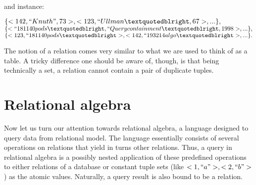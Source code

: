 \documentclass[12pt]{article}
\begin{document}
	and instance:

\begin{adjustwidth}{2cm}{}
		$\{<142, ``Knuth", 73>,<123, ``Ullman”, 67>, ...\}, $\\
		$\{<``181140pods”, ``Query containment”, 1998>, ...\},$\\ 
		$\{<123, ``181140pods”>,<142, ``193214algo”>, ...\}.$\\
\end{adjustwidth}

The notion of a relation comes very similar to what we are used to think of as a table.
A tricky difference one should be aware of, though, is that being technically a set, a relation
cannot contain a pair of duplicate tuples.

\section{Relational algebra}

Now let us turn our attention towards relational algebra, a language designed to query data
from relational model. The language essentially consists of several operations on relations
that yield in turns other relations. Thus, a query in relational algebra is a
possibly nested application of these predefined operations to either relations of a database
or constant tuple sets (like ${<1,``a">, <2,``b">}$) as the atomic values.
Naturally, a query result is also bound to be a relation.
\end{document}
